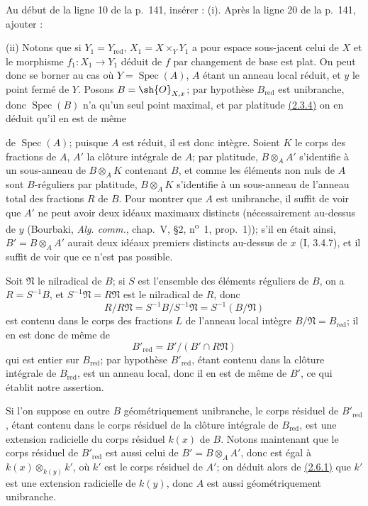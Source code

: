 Au début de la ligne 10 de la p.~141, insérer : (i). Après la ligne 20
de la p.~141, ajouter :

\smallskip
\noindent
\textup{(ii)} Notons que si $Y_1=Y_{\mathrm{red}}$,
$X_1=X\times_Y Y_1$ a pour espace sous-jacent celui de $X$ et le
morphisme $f_1:X_1\to Y_1$ déduit de $f$ par changement de base est
plat. On peut donc se borner au cas où $Y=\operatorname{Spec}(A)$,
$A$ étant un anneau local réduit, et $y$ le point fermé de $Y$. Posons
$B=\sh{O}_{X,x}$; par hypothèse $B_{\mathrm{red}}$ est unibranche, donc
$\operatorname{Spec}(B)$ n'a qu'un seul point maximal, et par platitude
{\hyperref[canon-index.ega4.c04.prop.2-3-4]{(2.3.4)}} on en déduit qu'il en est de
même

de $\operatorname{Spec}(A)$; puisque $A$ est réduit, il est donc
intègre. Soient $K$ le corps des fractions de $A$, $A'$ la clôture
intégrale de $A$; par platitude, $B\otimes_AA'$ s'identifie à un
sous-anneau de $B\otimes_AK$ contenant $B$, et comme les éléments non
nuls de $A$ sont $B$-réguliers par platitude, $B\otimes_AK$ s'identifie
à un sous-anneau de l'anneau total des fractions $R$ de $B$. Pour
montrer que $A$ est unibranche, il suffit de voir que $A'$ ne peut avoir
deux idéaux maximaux distincts (nécessairement au-dessus de $y$
(Bourbaki, \emph{Alg. comm.}, chap.~V, \S2,
n\textsuperscript{o}~1, prop.~1)); s'il en était ainsi,
$B'=B\otimes_AA'$ aurait deux idéaux premiers distincts au-dessus de
$x$ (I, 3.4.7), et il suffit de voir que ce n'est pas possible.

Soit $\mathfrak N$ le nilradical de $B$; si $S$ est l'ensemble des
éléments réguliers de $B$, on a $R=S^{-1}B$, et
$S^{-1}\mathfrak N=R\mathfrak N$ est le nilradical de $R$, donc
\[
 R/R\mathfrak N=S^{-1}B/S^{-1}\mathfrak N=S^{-1}(B/\mathfrak N)
\]
est contenu dans le corps des fractions $L$ de l'anneau local intègre
$B/\mathfrak N=B_{\mathrm{red}}$; il en est donc de même de
\[
 B'_{\mathrm{red}}=B'/(B'\cap R\mathfrak N)
\]
qui est entier sur $B_{\mathrm{red}}$; par hypothèse
$B'_{\mathrm{red}}$, étant contenu dans la clôture intégrale de
$B_{\mathrm{red}}$, est un anneau local, donc il en est de même de
$B'$, ce qui établit notre assertion.

Si l'on suppose en outre $B$ géométriquement unibranche, le corps
résiduel de $B'_{\mathrm{red}}$, étant contenu dans le corps résiduel de
la clôture intégrale de $B_{\mathrm{red}}$, est une extension radicielle
du corps résiduel $k(x)$ de $B$. Notons maintenant que le corps résiduel
de $B'_{\mathrm{red}}$ est aussi celui de $B'=B\otimes_AA'$, donc est
égal à $k(x)\otimes_{k(y)}k'$, où $k'$ est le corps résiduel de $A'$;
on déduit alors de {\hyperref[canon-index.ega4.c04.prop.2-6-1]{(2.6.1)}} que $k'$
est une extension radicielle de $k(y)$, donc $A$ est aussi
géométriquement unibranche.

